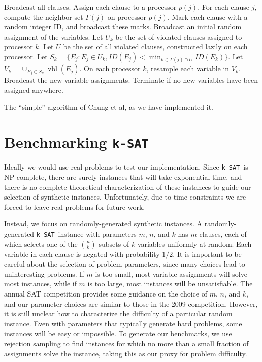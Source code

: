 \documentclass[twocolumn]{article}
\newcommand{\ksat}{\texttt{k-SAT}~}
\begin{document}
\begin{algorithm}[H]
\label{alg:implementation}
\begin{algorithmic}
\State Broadcast all clauses.
\State Assign each clause to a processor $p(j)$.
\State For each clause $j$, compute the neighbor set $\Gamma(j)$ on processor $p(j)$.
\State Mark each clause with a random integer ID, and broadcast these marks.
\State Broadcast an initial random assignment of the variables.
  \State Let $U_k$ be the set of violated clauses assigned to processor $k$.
  \State Let $U$ be the set of all violated clauses, constructed lazily on each processor.
  \State Let $S_k = \{E_j: E_j \in U_k, ID(E_j) < \min_{k \in \Gamma(j) \cap U} ID(E_k)\}$.
  \State Let $V_k = \cup_{E_j \in S_k} \operatorname{vbl}(E_j)$.
  \State On each processor $k$, resample each variable in $V_k$.
  \State Broadcast the new variable assignments.
  \State Terminate if no new variables have been assigned anywhere.
\EndWhile
\end{algorithmic}
\caption{The ``simple'' algorithm of Chung et al, as we have implemented it.}
\end{algorithm}

\section{Benchmarking \ksat}
\label{sec:benchmarks}
Ideally we would use real problems to test our implementation.  Since \ksat is NP-complete, there are surely instances that will take exponential time, and there is no complete theoretical characterization of these instances to guide our selection of synthetic instances.  Unfortunately, due to time constraints we are forced to leave real problems for future work.

Instead, we focus on randomly-generated synthetic instances.  A randomly-generated \ksat instance with parameters $m$, $n$, and $k$ has $m$ clauses, each of which selects one of the ${n \choose k}$ subsets of $k$ variables uniformly at random.  Each variable in each clause is negated with probability $1/2$.  It is important to be careful about the selection of problem parameters, since many choices lead to uninteresting problems.  If $m$ is too small, most variable assignments will solve most instances, while if $m$ is too large, most instances will be unsatisfiable.  The annual SAT competition \cite{belov2014sat} provides some guidance on the choice of $m$, $n$, and $k$, and our parameter choices are similar to those in the 2009 competition.  However, it is still unclear how to characterize the difficulty of a particular random instance.  Even with parameters that typically generate hard problems, some instances will be easy or impossible.  To generate our benchmarks, we use rejection sampling to find instances for which no more than a small fraction of assignments solve the instance, taking this as our proxy for problem difficulty.
\end{document}
